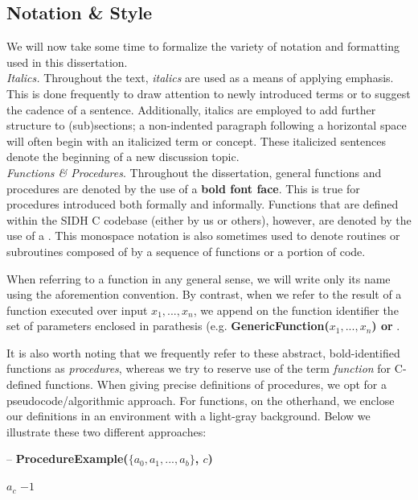 \subsection{Notation \& Style}

We will now take some time to formalize the variety of notation and formatting used in this dissertation.\\

\noindent
\textit{Italics.} Throughout the text, \textit{italics} are used as a means of applying emphasis. This is done frequently to draw attention to newly introduced terms or to suggest the cadence of a sentence. Additionally, italics are employed to add further structure to (sub)sections; a non-indented paragraph following a horizontal space will often begin with an italicized term or concept. These italicized sentences denote the beginning of a new discussion topic.\\

\noindent
\textit{Functions \& Procedures}. Throughout the dissertation, general functions and procedures are denoted by the use of a \textbf{bold font face}. This is true for procedures introduced both formally and informally. Functions that are defined within the SIDH C codebase (either by us or others), however, are denoted by the use of a . This monospace notation is also sometimes used to denote routines or subroutines composed of by a sequence of functions or a portion of code. 

When referring to a function in any general sense, we will write only its name using the aforemention convention. By contrast, when we refer to the result of a function executed over input $x_{1}, ..., x_{n}$, we append on the function identifier the set of parameters enclosed in parathesis (e.g. \textbf{GenericFunction($x_{1}, ..., x_{n}$) or }. 

It is also worth noting that we frequently refer to these abstract, bold-identified functions as \textit{procedures}, whereas we try to reserve use of the term \textit{function} for C-defined functions. When giving precise definitions of procedures, we opt for a pseudocode/algorithmic approach. For functions, on the otherhand, we enclose our definitions in an environment with a light-gray background. Below we illustrate these two different approaches:\\

\begin{algorithm}
\caption{-- \textbf{ProcedureExample($\{a_0, a_1, ... , a_b\}$, $c$)}}\label{alg:procedureexample}
\begin{algorithmic}[1]
	\State \Return $a_c$
\Else
	\State \Return $-1$
\EndIf
\end{algorithmic}
\end{algorithm}

